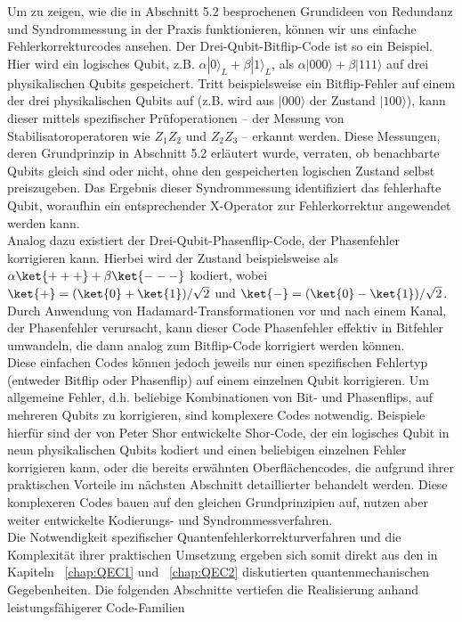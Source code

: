 Um zu zeigen, wie die in Abschnitt 5.2 besprochenen Grundideen von Redundanz und Syndrommessung in der Praxis funktionieren, können wir uns einfache Fehlerkorrekturcodes ansehen. Der Drei-Qubit-Bitflip-Code ist so ein Beispiel. Hier wird ein logisches Qubit, z.B. $\alpha|0\rangle_L + \beta|1\rangle_L$, als $\alpha|000\rangle+\beta|111\rangle$ auf drei physikalischen Qubits gespeichert. Tritt beispielsweise ein Bitflip-Fehler auf einem der drei physikalischen Qubits auf (z.B. wird aus $|000\rangle$ der Zustand $|100\rangle$), kann dieser mittels spezifischer Prüfoperationen – der Messung von Stabilisatoroperatoren wie $Z_1Z_2$ und $Z_2Z_3$ – erkannt werden. Diese Messungen, deren Grundprinzip in Abschnitt 5.2 erläutert wurde, verraten, ob benachbarte Qubits gleich sind oder nicht, ohne den gespeicherten logischen Zustand selbst preiszugeben. Das Ergebnis dieser Syndrommessung identifiziert das fehlerhafte Qubit, woraufhin ein entsprechender X-Operator zur Fehlerkorrektur angewendet werden kann.\cite[Seite 427-430]{nielsen_quantum_2010}\\

Analog dazu existiert der Drei-Qubit-Phasenflip-Code, der Phasenfehler korrigieren kann. Hierbei wird der Zustand beispielsweise als $\alpha\ket{+++}+\beta\ket{---}$ kodiert, wobei $\ket{+}=(\ket{0}+\ket{1})/\sqrt{2}$ und $\ket{-}=(\ket{0}-\ket{1})/\sqrt{2}$. Durch Anwendung von Hadamard-Transformationen vor und nach einem Kanal, der Phasenfehler verursacht, kann dieser Code Phasenfehler effektiv in Bitfehler umwandeln, die dann analog zum Bitflip-Code korrigiert werden können.\cite[Seite 430-431]{nielsen_quantum_2010}\\

Diese einfachen Codes können jedoch jeweils nur einen spezifischen Fehlertyp (entweder Bitflip oder Phasenflip) auf einem einzelnen Qubit korrigieren. Um allgemeine Fehler, d.h. beliebige Kombinationen von Bit- und Phasenflips, auf mehreren Qubits zu korrigieren, sind komplexere Codes notwendig. Beispiele hierfür sind der von Peter Shor entwickelte Shor-Code, der ein logisches Qubit in neun physikalischen Qubits kodiert und einen beliebigen einzelnen Fehler korrigieren kann, oder die bereits erwähnten Oberflächencodes, die aufgrund ihrer praktischen Vorteile im nächsten Abschnitt detaillierter behandelt werden. Diese komplexeren Codes bauen auf den gleichen Grundprinzipien auf, nutzen aber weiter entwickelte Kodierungs- und Syndrommessverfahren.\cite[Seite 432ff]{nielsen_quantum_2010}\\
Die Notwendigkeit spezifischer Quantenfehlerkorrekturverfahren und die Komplexität ihrer praktischen Umsetzung ergeben sich somit direkt aus den in Kapiteln ~\ref{chap:QEC1} und ~\ref{chap:QEC2} diskutierten quantenmechanischen Gegebenheiten. Die folgenden Abschnitte vertiefen die Realisierung anhand leistungsfähigerer Code-Familien


